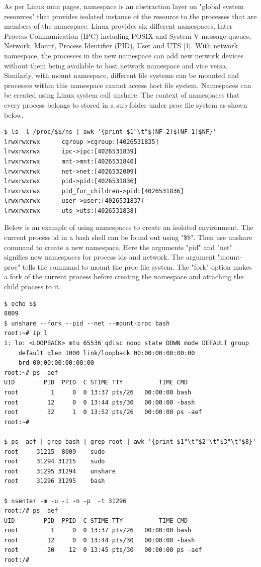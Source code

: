 \documentclass[english, 12pt, a4paper, elec, utf8, a-1b, online]{aaltothesis}
\begin{document}
As per Linux man pages, namespace is an abstraction layer on "global system resources" that provides isolated instance of the resource to the processes that are members of the namespace. Linux provides six different namespaces, Inter Process Communication (IPC) including POSIX and System V message queues, Network, Mount, Process Identifier (PID), User and UTS [1]. With network namespace, the processes in the new namespace can add new network devices without them being available to host network namespace and vice versa. Similarly, with mount namespace, different file systems can be mounted and processes within this namespace cannot access host file system. Namespaces can be created using Linux system call unshare. The context of namespaces that every process belongs to stored in a sub-folder under proc file system as shown below.
\begin{lstlisting}[basicstyle={\small\ttfamily}]
$ ls -l /proc/$$/ns | awk '{print $1"\t"$(NF-2)$(NF-1)$NF}'
lrwxrwxrwx      cgroup->cgroup:[4026531835]
lrwxrwxrwx      ipc->ipc:[4026531839]
lrwxrwxrwx      mnt->mnt:[4026531840]
lrwxrwxrwx      net->net:[4026532009]
lrwxrwxrwx      pid->pid:[4026531836]
lrwxrwxrwx      pid_for_children->pid:[4026531836]
lrwxrwxrwx      user->user:[4026531837]
lrwxrwxrwx      uts->uts:[4026531838]

\end{lstlisting}

Below is an example of using namespaces to create an isolated environment. The current process id in a bash shell can be found out using "\$\$". Then use unshare command to create a new namespace. Here the arguments "pid" and "net" signifies new namespaces for process ids and network. The argument "mount-proc" tells the command to mount the proc file system. The "fork" option makes a fork of the current process before creating the namespace and attaching the child process to it. 

\begin{lstlisting}[basicstyle={\small\ttfamily}]
$ echo $$ 
8009
$ unshare --fork --pid --net --mount-proc bash
root:~# ip l
1: lo: <LOOPBACK> mtu 65536 qdisc noop state DOWN mode DEFAULT group
    default qlen 1000 link/loopback 00:00:00:00:00:00
    brd 00:00:00:00:00:00
root:~# ps -aef
UID        PID  PPID  C STIME TTY          TIME CMD
root         1     0  0 13:37 pts/26   00:00:00 bash
root        12     0  0 13:44 pts/30   00:00:00 -bash
root        32     1  0 13:52 pts/26   00:00:00 ps -aef
root:~#                                  

$ ps -aef | grep bash | grep root | awk '{print $1"\t"$2"\t"$3"\t"$8}'
root     31215  8009    sudo
root     31294 31215    sudo
root     31295 31294    unshare
root     31296 31295    bash

$ nsenter -m -u -i -n -p  -t 31296
root:/# ps -aef
UID        PID  PPID  C STIME TTY          TIME CMD
root         1     0  0 13:37 pts/26   00:00:00 bash
root        12     0  0 13:44 pts/30   00:00:00 -bash
root        30    12  0 13:45 pts/30   00:00:00 ps -aef
root:/# 

\end{lstlisting}
\end{document}
